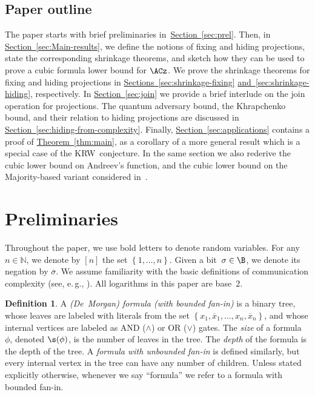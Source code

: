 \documentclass[11pt]{article}
\numberwithin{equation}{section}
\theoremstyle{definition}
\newtheorem{definition}[theorem]{Definition}
\theoremstyle{plain}
\newcommand{\N}{\mathbb N}
\newcommand{\eg}{e.\,g.}
\newcommand{\expref}[2]{\hyperref[#2]{#1~\ref{#2}}}
\theoremstyle{definition}\newtheorem{notation}[theorem]{Notation}\theoremstyle{plain}
\begin{document}
%
\subsection{Paper outline}   %

The paper starts with brief preliminaries in~\expref{Section}{sec:prel}. Then,
in \expref{Section}{sec:Main-results}, we define the notions of fixing and hiding
projections, state the corresponding shrinkage theorems, and sketch
how they can be used to prove a cubic formula lower bound for $\ACz$.
We prove the shrinkage theorems for fixing and hiding projections in
\expref{Sections}{sec:shrinkage-fixing} 
\expref{and}{sec:shrinkage-hiding}, %
 respectively.
In \expref{Section}{sec:join} we provide a brief interlude on the join operation
for projections. The quantum adversary bound, the Khrapchenko bound,
and their relation to hiding projections are discussed in \expref{Section}{sec:hiding-from-complexity}.
Finally, \expref{Section}{sec:applications} contains a proof of \expref{Theorem}{thm:main},
as a corollary of a more general result which is a special case of
the KRW~conjecture. In the same section we also rederive the cubic
lower bound on Andreev's function, and the cubic lower bound on the
Majority-based variant considered in~\cite{GTN19}.

\section{\label{sec:prel}Preliminaries}

Throughout the paper, we use bold letters to denote random variables.
For any $n\in\N$, we denote by $\left[n\right]$ the set $\left\{ 1,\ldots,n\right\} $.
Given a bit~$\sigma\in\B$, we denote its negation by $\overline{\sigma}$.
We assume familiarity with the basic definitions of communication
complexity (see, \eg, \cite{KN_book}). All logarithms in this paper
are base~$2$. 
\begin{definition}
A \emph{(De~Morgan) formula (with bounded fan-in)} is a binary tree,
whose leaves are labeled with literals from the set $\left\{ x_{1},\overline{x}_{1},\ldots,x_{n},\overline{x}_{n}\right\} $,
and whose internal vertices are labeled as AND ($\wedge$) or OR ($\vee$)
gates. The \emph{size} of a formula~$\phi$, denoted $\s(\phi)$,
is the number of leaves in the tree. The \emph{depth} of the formula
is the depth of the tree. A \emph{formula with unbounded fan-in} is
defined similarly, but every internal vertex in the tree can have
any number of children. Unless stated explicitly otherwise, whenever
we say ``formula'' we refer to a formula with bounded fan-in. 
\end{definition}
\end{document}
